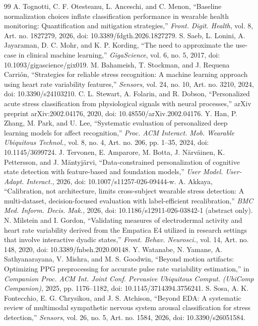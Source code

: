 \documentclass[journal]{IEEEtran}
\begin{document}
\begin{thebibliography}{99}
 A. Tognotti, C. F. Otesteanu, L. Anceschi, and C. Menon, ``Baseline normalization choices inflate classification performance in wearable health monitoring: Quantification and mitigation strategies,'' \emph{Front. Digit. Health}, vol. 8, Art. no. 1827279, 2026, doi: 10.3389/fdgth.2026.1827279.
 S. Saeb, L. Lonini, A. Jayaraman, D. C. Mohr, and K. P. Kording, ``The need to approximate the use-case in clinical machine learning,'' \emph{GigaScience}, vol. 6, no. 5, 2017, doi: 10.1093/gigascience/gix019.
 M. Bahameish, T. Stockman, and J. Requena Carri\'on, ``Strategies for reliable stress recognition: A machine learning approach using heart rate variability features,'' \emph{Sensors}, vol. 24, no. 10, Art. no. 3210, 2024, doi: 10.3390/s24103210.
 C. L. Stewart, A. Folarin, and R. Dobson, ``Personalized acute stress classification from physiological signals with neural processes,'' arXiv preprint arXiv:2002.04176, 2020, doi: 10.48550/arXiv.2002.04176.
 Y. Han, P. Zhang, M. Park, and U. Lee, ``Systematic evaluation of personalized deep learning models for affect recognition,'' \emph{Proc. ACM Interact. Mob. Wearable Ubiquitous Technol.}, vol. 8, no. 4, Art. no. 206, pp. 1--35, 2024, doi: 10.1145/3699724.
 J. Tervonen, E. Amparore, M. Botta, J. N\"arv\"ainen, K. Pettersson, and J. M\"antyj\"arvi, ``Data-constrained personalization of cognitive state detection with feature-based and foundation models,'' \emph{User Model. User-Adapt. Interact.}, 2026, doi: 10.1007/s11257-026-09444-w.
 A. Akkaya, ``Calibration, not architecture, limits cross-subject wearable stress detection: A multi-dataset, decision-focused evaluation with label-efficient recalibration,'' \emph{BMC Med. Inform. Decis. Mak.}, 2026, doi: 10.1186/s12911-026-03842-1 (abstract only).
 N. Milstein and I. Gordon, ``Validating measures of electrodermal activity and heart rate variability derived from the Empatica E4 utilized in research settings that involve interactive dyadic states,'' \emph{Front. Behav. Neurosci.}, vol. 14, Art. no. 148, 2020, doi: 10.3389/fnbeh.2020.00148.
 Y. Watanabe, N. Yamane, A. Sathyanarayana, V. Mishra, and M. S. Goodwin, ``Beyond motion artifacts: Optimizing PPG preprocessing for accurate pulse rate variability estimation,'' in \emph{Companion Proc. ACM Int. Joint Conf. Pervasive Ubiquitous Comput. (UbiComp Companion)}, 2025, pp. 1176--1182, doi: 10.1145/3714394.3756241.
 S. Sosa, A. K. Fontecchio, E. G. Chrysikou, and J. S. Atchison, ``Beyond EDA: A systematic review of multimodal sympathetic nervous system arousal classification for stress detection,'' \emph{Sensors}, vol. 26, no. 5, Art. no. 1584, 2026, doi: 10.3390/s26051584.

\end{thebibliography}
\end{document}
